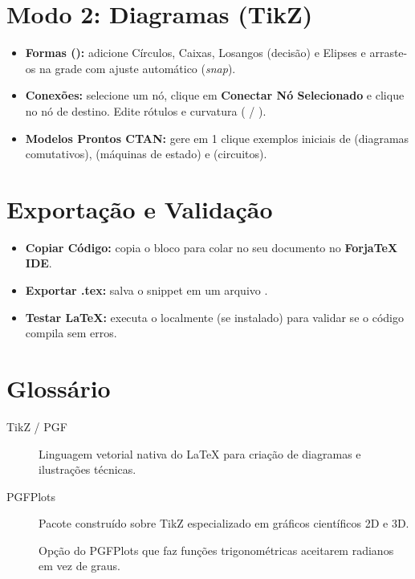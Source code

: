 \documentclass[11pt,a4paper]{article}
\begin{document}
\section{Modo 2: Diagramas (TikZ)}
\begin{itemize}
  \item \textbf{Formas ():} adicione Círculos, Caixas, Losangos (decisão) e Elipses e arraste-os na grade com ajuste automático (\textit{snap}).
  \item \textbf{Conexões:} selecione um nó, clique em \textbf{Conectar Nó Selecionado} e clique no nó de destino. Edite rótulos e curvatura ( / ).
  \item \textbf{Modelos Prontos CTAN:} gere em 1 clique exemplos iniciais de  (diagramas comutativos),  (máquinas de estado) e  (circuitos).
\end{itemize}

\section{Exportação e Validação}
\begin{itemize}
  \item \textbf{Copiar Código:} copia o bloco  para colar no seu documento no \textbf{ForjaTeX IDE}.
  \item \textbf{Exportar .tex:} salva o snippet em um arquivo .
  \item \textbf{Testar LaTeX:} executa o  localmente (se instalado) para validar se o código compila sem erros.
\end{itemize}

\section{Glossário}
\begin{description}
  \item[TikZ / PGF] Linguagem vetorial nativa do \LaTeX{} para criação de diagramas e ilustrações técnicas.
  \item[PGFPlots] Pacote construído sobre TikZ especializado em gráficos científicos 2D e 3D.
  \item[] Opção do PGFPlots que faz funções trigonométricas aceitarem radianos em vez de graus.
\end{description}
\end{document}
